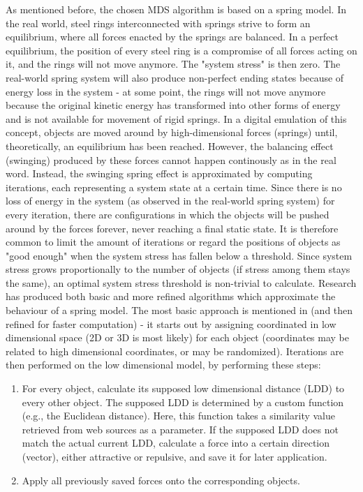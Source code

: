 As mentioned before, the chosen MDS algorithm is based on a spring model. In the real world, steel rings interconnected with springs strive to form an equilibrium, where all forces enacted by the springs are balanced. In a perfect equilibrium, the position of every steel ring is a compromise of all forces acting on it, and the rings will not move anymore. The "system stress" is then zero. The real-world spring system will also produce non-perfect ending states because of energy loss in the system - at some point, the rings will not move anymore because the original kinetic energy has transformed into other forms of energy and is not available for movement of rigid springs.
In a digital emulation of this concept, objects are moved around by high-dimensional forces (springs) until, theoretically, an equilibrium has been reached. However, the balancing effect (swinging) produced by these forces cannot happen continously as in the real word. Instead, the swinging spring effect is approximated by computing iterations, each representing a system state at a certain time. Since there is no loss of energy in the system (as observed in the real-world spring system) for every iteration, there are configurations in which the objects will be pushed around by the forces forever, never reaching a final static state. It is therefore common to limit the amount of iterations or regard the positions of objects as "good enough" when the system stress has fallen below a threshold. Since system stress grows proportionally to the number of objects (if stress among them stays the same), an optimal system stress threshold is non-trivial to calculate.
Research has produced both basic and more refined algorithms which approximate the behaviour of a spring model. 
The most basic approach is mentioned in \cite{Chalmers:1996:LIT:244979.245035} (and then refined for faster computation) - 
it starts out by assigning coordinated in low dimensional space (2D or 3D is most likely) for each object (coordinates may be related to high dimensional coordinates, or may be randomized). Iterations are then performed on the low dimensional model, by performing these steps:

\begin{enumerate}
	\item For every object, calculate its supposed low dimensional distance (LDD) to every other object. The supposed LDD is determined by a custom function (e.g., the Euclidean distance). Here, this function takes a similarity value retrieved from web sources as a parameter.
	\subitem If the supposed LDD does not match the actual current LDD, calculate a force into a certain direction (vector), either attractive or repulsive, and save it for later application.
	\item Apply all previously saved forces onto the corresponding objects.
\end{enumerate}		

